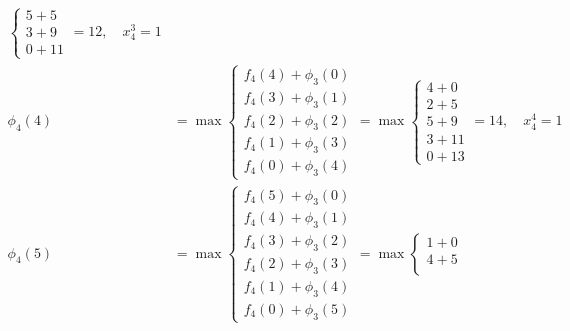 \documentclass{article}
\begin{document}
\[\begin{aligned}
\begin{cases}
                                                  5 + 5 \\
                                                  3 + 9 \\
                                                  0 + 11
                                              \end{cases} = 12, \quad x_4^3 = 1               \\
        \phi_4(4) & = \max \begin{cases}
                               f_4(4) + \phi_3(0) \\
                               f_4(3) + \phi_3(1) \\
                               f_4(2) + \phi_3(2) \\
                               f_4(1) + \phi_3(3) \\
                               f_4(0) + \phi_3(4)
                           \end{cases} = \max \begin{cases}
                                                  4 + 0  \\
                                                  2 + 5  \\
                                                  5 + 9  \\
                                                  3 + 11 \\
                                                  0 + 13
                                              \end{cases} = 14, \quad x_4^4 = 1               \\
        \phi_4(5) & = \max \begin{cases}
                               f_4(5) + \phi_3(0) \\
                               f_4(4) + \phi_3(1) \\
                               f_4(3) + \phi_3(2) \\
                               f_4(2) + \phi_3(3) \\
                               f_4(1) + \phi_3(4) \\
                               f_4(0) + \phi_3(5)
                           \end{cases} = \max \begin{cases}
                                                  1 + 0  \\
                                                  4 + 5  \\

\end{cases}
\end{aligned}\]
\end{document}
